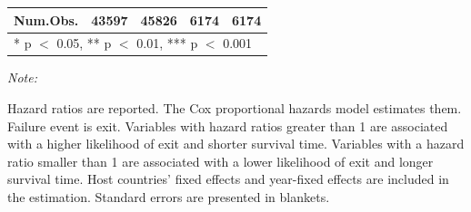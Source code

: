 \begin{table}
\begin{threeparttable}
\begin{tabular}[t]{lcccc}
Num.Obs. & \num{43597} & \num{45826} & \num{6174} & \num{6174}\\
\bottomrule
\multicolumn{5}{l}{\rule{0pt}{1em}* p $<$ 0.05, ** p $<$ 0.01, *** p $<$ 0.001}\\
\end{tabular}
\begin{tablenotes}
\item \textit{Note: } 
\item Hazard ratios are reported. The Cox proportional hazards model estimates them. Failure event is exit. Variables with hazard ratios greater than 1 are associated with a higher likelihood of exit and shorter survival time. Variables with a hazard ratio smaller than 1 are associated with a lower likelihood of exit and longer survival time. Host countries' fixed effects and year-fixed effects are included in the estimation. Standard errors are presented in blankets.
\end{tablenotes}
\end{threeparttable}
\end{table}
